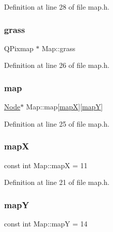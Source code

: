 Definition at line 28 of file map.\+h.

\mbox{\label{class_map_a322ef8e3f55269ef565a58f20190d148}} 
\subsubsection{\texorpdfstring{grass}{grass}}
{\footnotesize\ttfamily Q\+Pixmap $\ast$ Map\+::grass}



Definition at line 26 of file map.\+h.

\mbox{\label{class_map_a7298e7a7b5dbdc642c49ded9a2c754a5}} 
\subsubsection{\texorpdfstring{map}{map}}
{\footnotesize\ttfamily \hyperlink{class_node}{Node}$\ast$ Map\+::map\mbox{[}\hyperlink{class_map_acfd20721da29a2e353598555e23e12f0}{mapX}\mbox{]}\mbox{[}\hyperlink{class_map_ae08efae9ac1453b2690985c627aca358}{mapY}\mbox{]}}



Definition at line 25 of file map.\+h.

\mbox{\label{class_map_acfd20721da29a2e353598555e23e12f0}} 
\subsubsection{\texorpdfstring{mapX}{mapX}}
{\footnotesize\ttfamily const int Map\+::mapX = 11\hspace{0.3cm}{\ttfamily [static]}}



Definition at line 21 of file map.\+h.

\mbox{\label{class_map_ae08efae9ac1453b2690985c627aca358}} 
\subsubsection{\texorpdfstring{mapY}{mapY}}
{\footnotesize\ttfamily const int Map\+::mapY = 14\hspace{0.3cm}{\ttfamily [static]}}



